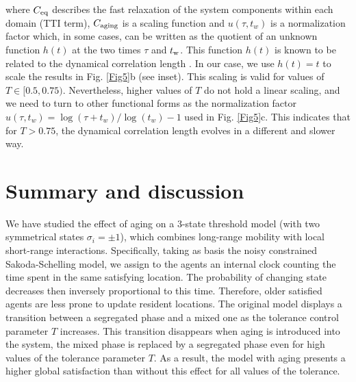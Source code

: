 where $C_{\rm{eq}}$ describes the fast relaxation of the system components within each domain (TTI term), $C_{\rm{aging}}$ is a scaling function and $u(\tau,t_w)$ is a normalization factor which, in some cases, can be written as the quotient of an unknown function $h(t)$ at the two times $\tau$ and $t_{\rm{w}}$. This function $h(t)$ is known to be related to the dynamical correlation length  \cite{Heisemberg,8Heisemberg}. In our case, we use $h(t) = t$ to scale the results in Fig. \ref{Fig5}b (see inset). This scaling is valid for values of $T \in [0.5,0.75)$. Nevertheless, higher values of $T$ do not hold a linear scaling, and we need to turn to other functional forms as the normalization factor $u(\tau,t_w) =  \log(\tau+t_w)/\log(t_w) - 1$ used in  Fig. \ref{Fig5}c. This indicates that for $T > 0.75$, the dynamical correlation length evolves in a different and slower way.

\section{\label{sec:Summary and Conclusions} Summary and discussion}

We have studied the effect of aging on a 3-state threshold model (with two symmetrical states $\sigma_i = \pm 1$), which combines long-range mobility with local short-range interactions. Specifically, taking as basis the noisy constrained Sakoda-Schelling model, we assign to the agents an internal clock counting the time spent in the same satisfying location. The probability of changing state decreases then inversely proportional to this time. Therefore,  older satisfied agents are less prone to update resident locations. The original model displays a transition between a segregated phase and a mixed one as the tolerance control parameter $T$ increases. This transition disappears when aging is introduced into the system, the mixed phase is replaced by a segregated phase even for high values of the tolerance parameter $T$. As a result, the model with aging presents a higher global satisfaction than without this effect for all values of the tolerance.

